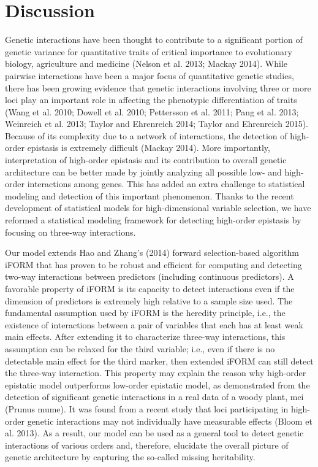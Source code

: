 \documentclass[]{book}
\theoremstyle{definition}
\theoremstyle{definition}
\theoremstyle{remark}
\begin{document}
\section{Discussion}\label{discussion-1}

Genetic interactions have been thought to contribute to a significant
portion of genetic variance for quantitative traits of critical
importance to evolutionary biology, agriculture and medicine (Nelson et
al. 2013; Mackay 2014). While pairwise interactions have been a major
focus of quantitative genetic studies, there has been growing evidence
that genetic interactions involving three or more loci play an important
role in affecting the phenotypic differentiation of traits (Wang et al.
2010; Dowell et al. 2010; Pettersson et al. 2011; Pang et al. 2013;
Weinreich et al. 2013; Taylor and Ehrenreich 2014; Taylor and Ehrenreich
2015). Because of its complexity due to a network of interactions, the
detection of high-order epistasis is extremely difficult (Mackay 2014).
More importantly, interpretation of high-order epistasis and its
contribution to overall genetic architecture can be better made by
jointly analyzing all possible low- and high-order interactions among
genes. This has added an extra challenge to statistical modeling and
detection of this important phenomenon. Thanks to the recent development
of statistical models for high-dimensional variable selection, we have
reformed a statistical modeling framework for detecting high-order
epistasis by focusing on three-way interactions.

Our model extends Hao and Zhang's (2014) forward selection-based
algorithm iFORM that has proven to be robust and efficient for computing
and detecting two-way interactions between predictors (including
continuous predictors). A favorable property of iFORM is its capacity to
detect interactions even if the dimension of predictors is extremely
high relative to a sample size used. The fundamental assumption used by
iFORM is the heredity principle, i.e., the existence of interactions
between a pair of variables that each has at least weak main effects.
After extending it to characterize three-way interactions, this
assumption can be relaxed for the third variable; i.e., even if there is
no detectable main effect for the third marker, then extended iFORM can
still detect the three-way interaction. This property may explain the
reason why high-order epistatic model outperforms low-order epistatic
model, as demonstrated from the detection of significant genetic
interactions in a real data of a woody plant, mei (Prunus mume). It was
found from a recent study that loci participating in high-order genetic
interactions may not individually have measurable effects (Bloom et al.
2013). As a result, our model can be used as a general tool to detect
genetic interactions of various orders and, therefore, elucidate the
overall picture of genetic architecture by capturing the so-called
missing heritability.
\end{document}
